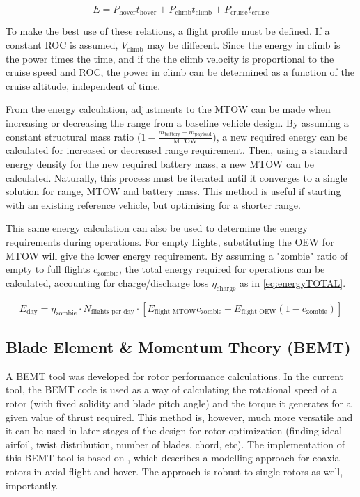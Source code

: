 \begin{equation}
    \label{eq:energy}
    E = P_\text{hover}t_\text{hover} + P_\text{climb}t_\text{climb} + P_\text{cruise}t_\text{cruise}
\end{equation}

To make the best use of these relations, a flight profile must be defined. If a constant ROC is assumed, $V_\text{climb}$ may be different. Since the energy in climb is the power times the time, and if the the climb velocity is proportional to the cruise speed and ROC, the power in climb can be determined as a function of the cruise altitude, independent of time.

From the energy calculation, adjustments to the MTOW can be made when increasing or decreasing the range from a baseline vehicle design. By assuming a constant structural mass ratio ($1-\frac{m_\text{battery}+m_\text{payload}}{\text{MTOW}}$), a new required energy can be calculated for increased or decreased range requirement. Then, using a standard energy density for the new required battery mass, a new MTOW can be calculated. Naturally, this process must be iterated until it converges to a single solution for range, MTOW and battery mass. This method is useful if starting with an existing reference vehicle, but optimising for a shorter range.

This same energy calculation can also be used to determine the energy requirements during operations. For empty flights, substituting the OEW for MTOW will give the lower energy requirement. By assuming a "zombie" ratio of empty to full flights $c_\text{zombie}$, the total energy required for operations can be calculated, accounting for charge/discharge loss $\eta_\text{charge}$ as in \autoref{eq:energyTOTAL}.

\begin{equation}
    \label{eq:energyTOTAL}
    E_\text{day} = \eta_\text{zombie}\cdot N_\text{flights per day} \cdot \left[ E_\text{flight MTOW}c_\text{zombie} + E_\text{flight OEW}(1-c_\text{zombie}) \right]
\end{equation}



\subsection{Blade Element \& Momentum Theory (BEMT)}

A BEMT tool was developed for rotor performance calculations. In the current tool, the BEMT code is used as a way of calculating the rotational speed of a rotor (with fixed solidity and blade pitch angle) and the torque it generates for a given value of thrust required. This method is, however, much more versatile and it can be used in later stages of the design for rotor optimization (finding ideal airfoil, twist distribution, number of blades, chord, etc). The implementation of this BEMT tool is based on \cite{BEMT}, which describes a modelling approach for coaxial rotors in axial flight and hover. The approach is robust to single rotors as well, importantly.

